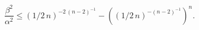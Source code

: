 \begin{equation}
\frac{\beta^{2}}{\alpha^{2}}\le \left (1/2\,n\right )^{-2\,\left
(n-2\right )^{-1}}-\left (\left (1/2 \,n\right )^{-\left (n-2\right
)^{-1}}\right )^{n}\label{sqsh}.
\end{equation}

